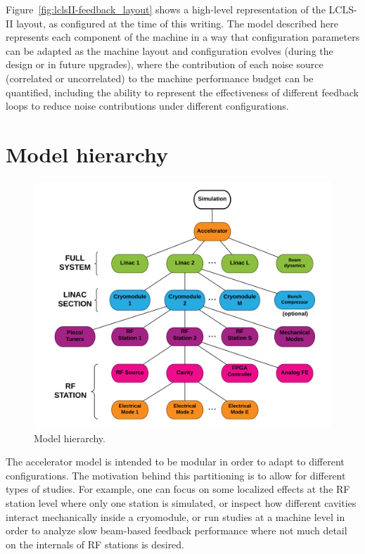 \documentclass[a4paper,12pt]{article}
\begin{document}
Figure~\ref{fig:lclsII-feedback_layout} shows a high-level representation of the LCLS-II layout, as configured at the time of this writing. The model described here represents each component of the machine in a way that configuration parameters can be adapted as the machine layout and configuration evolves (during the design or in future upgrades), where the contribution of each noise source (correlated or uncorrelated) to the machine performance budget can be quantified, including the ability to represent the effectiveness of different feedback loops to reduce noise contributions under different configurations. 

\section{Model hierarchy}

\begin{figure}
\centering
\includegraphics[scale=0.6]{../figures/Model_hierarchy.png}
\caption{Model hierarchy.}
\label{fig:model_hierarchy}
\end{figure}

The accelerator model is intended to be modular in order to adapt to different configurations. The motivation behind this partitioning is to allow for different types of studies. For example, one can focus on some localized effects at the RF station level where only one station is simulated, or inspect how different cavities interact mechanically inside a cryomodule, or run studies at a machine level in order to analyze slow beam-based feedback performance where not much detail on the internals of RF stations is desired.
\end{document}
